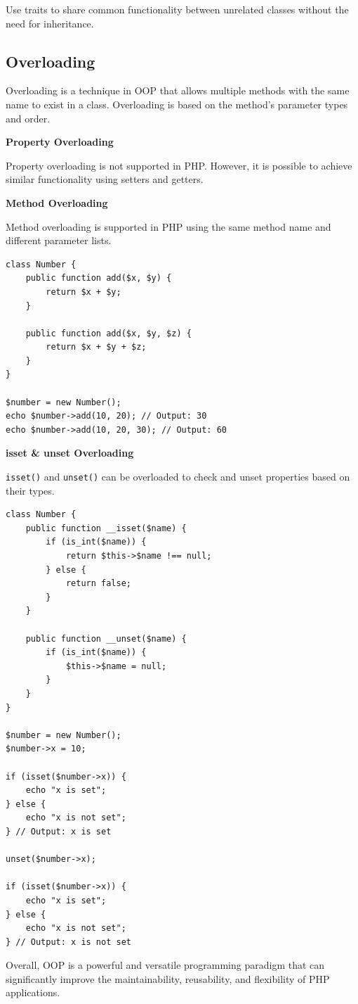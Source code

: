 \documentclass[11pt]{article}
\begin{document}
Use traits to share common functionality between unrelated classes
without the need for inheritance.

\subsection{\textbf{Overloading}}
\label{sec:orgc82881b}
Overloading is a technique in OOP that allows multiple methods with the
same name to exist in a class. Overloading is based on the method's
parameter types and order.

\textbf{Property Overloading}

Property overloading is not supported in PHP. However, it is possible to
achieve similar functionality using setters and getters.

\textbf{Method Overloading}

Method overloading is supported in PHP using the same method name and
different parameter lists.

\begin{verbatim}
class Number {
    public function add($x, $y) {
        return $x + $y;
    }

    public function add($x, $y, $z) {
        return $x + $y + $z;
    }
}

$number = new Number();
echo $number->add(10, 20); // Output: 30
echo $number->add(10, 20, 30); // Output: 60
\end{verbatim}

\textbf{isset \& unset Overloading}

\texttt{isset()} and \texttt{unset()} can be overloaded to check and unset properties
based on their types.

\begin{verbatim}
class Number {
    public function __isset($name) {
        if (is_int($name)) {
            return $this->$name !== null;
        } else {
            return false;
        }
    }

    public function __unset($name) {
        if (is_int($name)) {
            $this->$name = null;
        }
    }
}

$number = new Number();
$number->x = 10;

if (isset($number->x)) {
    echo "x is set";
} else {
    echo "x is not set";
} // Output: x is set

unset($number->x);

if (isset($number->x)) {
    echo "x is set";
} else {
    echo "x is not set";
} // Output: x is not set
\end{verbatim}

Overall, OOP is a powerful and versatile programming paradigm that can
significantly improve the maintainability, reusability, and flexibility
of PHP applications.
\end{document}
